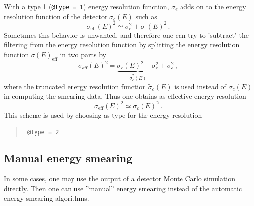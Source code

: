 With a type 1 ({\tt @type = 1}) energy resolution 
function, $\sigma_e$ adds on to the energy resolution function 
of the detector $\sigma_c(E)$ such as
\begin{equation}
\sigma_{\mathrm{eff}}(E)^2\simeq \sigma_e^2 + \sigma_c(E)^2\,.
\end{equation} 
Sometimes this behavior is unwanted, and therefore one can try to 
'subtract' the filtering from the energy resolution function by splitting 
the energy resolution function $\sigma(E)_{\mathrm{eff}}$ in
two parts by
\begin{equation}
\sigma_{\mathrm{eff}}(E)^2=\underbrace{\sigma_c(E)^2-\sigma_e^2}_
{\tilde\sigma^2_c(E)}+\sigma_e^2\,,
\end{equation}
where the truncated energy resolution function $\tilde\sigma_c(E)$ 
is used instead of $\sigma_c(E)$ in computing the
smearing data. Thus one obtains as effective energy resolution
\begin{equation}
\sigma_{\mathrm{eff}}(E)^2\simeq \sigma_c(E)^2\,.
\end{equation} 
This scheme is used by choosing as type for the energy resolution
\begin{quote}
{\tt
@type = 2
}
\end{quote}

\subsection{Manual energy smearing}

In some cases, one may use the output of a detector Monte Carlo simulation
directly. Then one can use ''manual'' energy smearing instead  of the
automatic energy smearing algorithms. 

